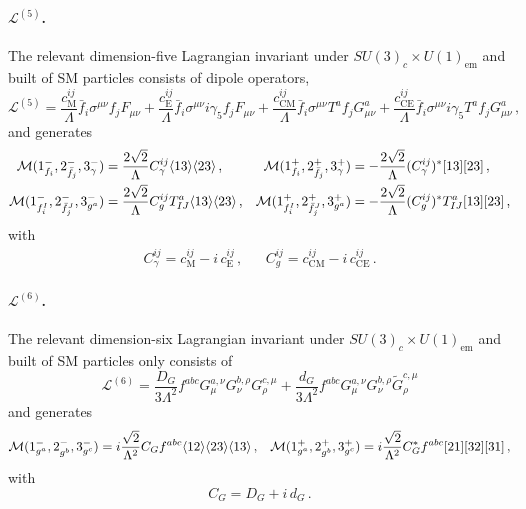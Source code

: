 \begin{subappendices}
\paragraph{\texorpdfstring{$\mathcal L^{(5)}$}{L(5)}.}
The relevant dimension-five Lagrangian invariant under $SU(3)_c\times U(1)_{\text{em}}$ and
built of SM particles consists of dipole operators,
\begin{equation}
    \mathcal L^{(5)} = \frac{c_{\text{M}}^{ij}}{\Lambda}\bar f_i \sigma^{\mu\nu} f_j F_{\mu\nu} + \frac{c_{\text{E}}^{ij}}{\Lambda}\bar f_i \sigma^{\mu\nu}i\gamma_5 f_j F_{\mu\nu} + \frac{c_{\text{CM}}^{ij}}{\Lambda}\bar f_i \sigma^{\mu\nu}T^a f_j G^a_{\mu\nu} + \frac{c_{\text{CE}}^{ij}}{\Lambda}\bar f_i \sigma^{\mu\nu}i\gamma_5 T^a f_j G^a_{\mu\nu}\,,
\end{equation}
and generates
\begin{align}
    \mathcal M(1^-_{f_i},2^-_{\bar f_j},3^-_\gamma) &= \frac{2\sqrt 2}{\Lambda}C_\gamma^{ij}\langle 1 3 \rangle\langle 2 3 \rangle\,, &
    \mathcal M(1^+_{f_i},2^+_{\bar f_j},3^+_\gamma)&=- \frac{2\sqrt 2}{\Lambda}(C_\gamma^{ij})^*\lbrack 1 3 \rbrack\lbrack 2 3 \rbrack\,,  \\
    \mathcal M(1^-_{f_i^I},2^-_{\bar f_j^J},3^-_{g^a}) &= \frac{2\sqrt 2}{\Lambda}C_g^{ij}T^a_{IJ}\langle 1 3 \rangle\langle 2 3 \rangle\,, &
    \mathcal M(1^+_{f_i^I},2^+_{\bar f_j^J},3^+_{g^a})&= - \frac{2\sqrt 2}{\Lambda}(C_g^{ij})^*T^a_{IJ}\lbrack 1 3 \rbrack\lbrack 2 3 \rbrack\,,
\end{align}
with
\begin{align}
    C_\gamma^{ij}=c_{\text{M}}^{ij}-i\, c_{\text{E}}^{ij}\,, && C_g^{ij}=c_{\text{CM}}^{ij}-i\,c_{\text{CE}}^{ij}\,.
\end{align}

\paragraph{\texorpdfstring{$\mathcal L^{(6)}$}{L(6)}.}
The relevant dimension-six Lagrangian invariant under $SU(3)_c\times U(1)_{\text{em}}$ and built
of SM particles only consists of
\begin{equation}
    \mathcal L^{(6)} = \frac{D_G}{3\Lambda^2} f^{abc} G_\mu^{a, \nu} G_{\nu}^{b, \rho} G_{\rho}^{c, \mu} + \frac{d_G}{3\Lambda^2} f^{abc} G_\mu^{a, \nu} G_{\nu}^{b, \rho} \widetilde G_{\rho}^{c, \mu}
\end{equation}
and generates
\begin{align}
    \mathcal M(1^-_{g^a},2^-_{g^b},3^-_{g^c}) = i\frac{\sqrt 2}{\Lambda^2}C_Gf^{abc}\langle 1 2 \rangle\langle 2 3 \rangle\langle 1 3 \rangle\,, &&
     \mathcal M(1^+_{g^a},2^+_{g^b},3^+_{g^c}) = i\frac{\sqrt 2}{\Lambda^2}C_G^* f^{abc}\lbrack 2 1 \rbrack\lbrack 3 2 \rbrack\lbrack 3 1 \rbrack\,,
\end{align}
with
\begin{equation}
    C_G= D_G + i\, d_G\,.
\end{equation}


\end{subappendices}
